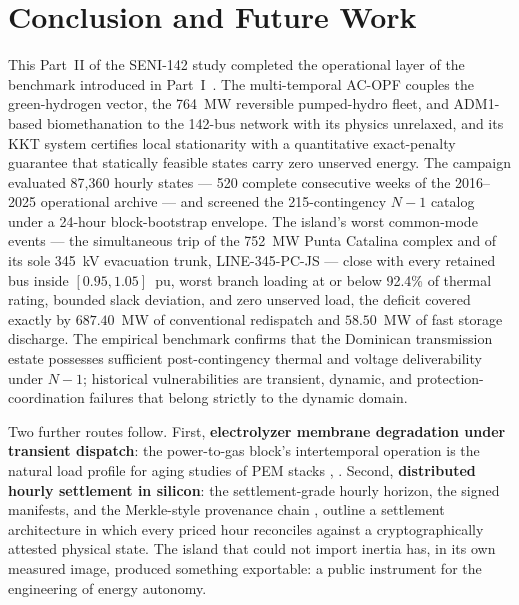 \section{Conclusion and Future Work}
\label{sec:conclusion}

This Part~II of the SENI-142 study completed the operational layer of the benchmark introduced in Part~I~\cite{seni142part1}. The multi-temporal AC-OPF couples the green-hydrogen vector, the 764~MW reversible pumped-hydro fleet, and ADM1-based biomethanation to the 142-bus network with its physics unrelaxed, and its KKT system certifies local stationarity with a quantitative exact-penalty guarantee that statically feasible states carry zero unserved energy. The campaign evaluated 87,360 hourly states --- 520 complete consecutive weeks of the 2016--2025 operational archive --- and screened the 215-contingency $N-1$ catalog under a 24-hour block-bootstrap envelope. The island's worst common-mode events --- the simultaneous trip of the 752~MW Punta Catalina complex and of its sole 345~kV evacuation trunk, LINE-345-PC-JS --- close with every retained bus inside $[0.95, 1.05]$~pu, worst branch loading at or below 92.4\% of thermal rating, bounded slack deviation, and zero unserved load, the deficit covered exactly by $687.40$~MW of conventional redispatch and $58.50$~MW of fast storage discharge. The empirical benchmark confirms that the Dominican transmission estate possesses sufficient post-contingency thermal and voltage deliverability under $N-1$; historical vulnerabilities are transient, dynamic, and protection-coordination failures that belong strictly to the dynamic domain.

Two further routes follow. First, \textbf{electrolyzer membrane degradation under transient dispatch}: the power-to-gas block's intertemporal operation is the natural load profile for aging studies of PEM stacks \cite{irena2020}, \cite{iea2023}. Second, \textbf{distributed hourly settlement in silicon}: the settlement-grade hourly horizon, the signed manifests, and the Merkle-style provenance chain \cite{merkle1987}, \cite{fips180} outline a settlement architecture in which every priced hour reconciles against a cryptographically attested physical state. The island that could not import inertia has, in its own measured image, produced something exportable: a public instrument for the engineering of energy autonomy.

